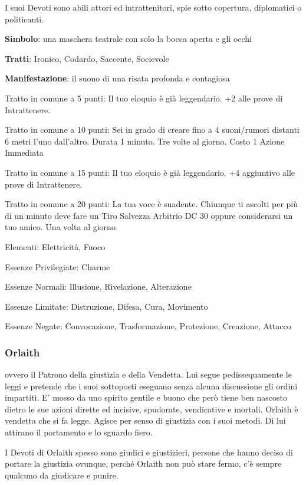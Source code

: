 \documentclass[a4paper,11pt,twoside,openany]{book}
\begin{document}
I suoi Devoti sono abili attori ed intrattenitori, spie sotto copertura, diplomatici o politicanti.

\textbf{Simbolo}: una maschera teatrale con solo la bocca aperta e
gli occhi

\textbf{Tratti}: Ironico, Codardo, Saccente, Socievole

\textbf{Manifestazione}: il suono di una risata profonda e contagiosa

\bigskip

Tratto in comune a 5 punti: Il tuo eloquio è già leggendario. +2 alle prove di Intrattenere.

Tratto in comune a 10 punti: Sei in grado di creare fino a 4 suoni/rumori distanti 6 metri l'uno dall'altro. Durata 1 minuto. Tre volte al giorno. Costo 1 Azione Immediata

Tratto in comune a 15 punti: Il tuo eloquio è già leggendario. +4 aggiuntivo alle prove di Intrattenere.

Tratto in comune a 20 punti: La tua voce è suadente. Chiunque ti ascolti per più di un minuto deve fare un Tiro Salvezza Arbitrio DC 30 oppure considerarsi un tuo amico. Una volta al giorno

\bigskip

Elementi: Elettricità, Fuoco

\bigskip

Essenze Privilegiate: Charme

Essenze Normali: Illusione, Rivelazione, Alterazione

Essenze Limitate: Distruzione, Difesa, Cura, Movimento

Essenze Negate: Convocazione, Trasformazione, Protezione, Creazione, Attacco

\subsubsection{Orlaith}

\label{orlaith}

ovvero il Patrono della giustizia e della Vendetta. Lui segue pedissequamente le leggi e pretende che i suoi sottoposti eseguano senza alcuna discussione gli ordini impartiti. E' mosso da uno spirito gentile e buono che però tiene ben nascosto dietro le sue azioni dirette ed incisive, spudorate, vendicative e mortali. Orlaith è vendetta che si fa legge. Agisce per senso di giustizia con i suoi metodi. Di lui attirano il portamento e lo sguardo fiero.

I Devoti di Orlaith spesso sono giudici e giustizieri, persone che hanno deciso di portare la giustizia ovunque, perché Orlaith non può stare fermo, c'è sempre qualcuno da giudicare e punire.
\end{document}
